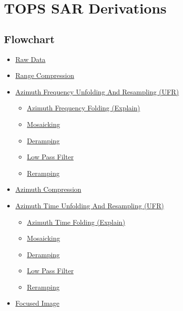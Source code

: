 \documentclass[10pt]{article}
\providecommand{\tightlist}{%
  \setlength{\itemsep}{0pt}\setlength{\parskip}{0pt}}
\begin{document}
\hypertarget{tops-sar-derivations}{%
\section{TOPS SAR Derivations}\label{tops-sar-derivations}}

\hypertarget{flowchart}{%
\subsection{Flowchart}\label{flowchart}}

\begin{itemize}
\tightlist
\item
  \protect\hyperlink{1-raw-data}{Raw Data}
\item
  \protect\hyperlink{2-range-compression}{Range Compression}
\item
  \protect\hyperlink{3-azimuth-frequency-unfolding-and-resampling-ufr}{Azimuth
  Frequency Unfolding And Resampling (UFR)}

  \begin{itemize}
  \tightlist
  \item
    \protect\hyperlink{31-azimuth-frequency-folding-explain}{Azimuth
    Frequency Folding (Explain)}
  \item
    \protect\hyperlink{32-mosaicking}{Mosaicking}
  \item
    \protect\hyperlink{33-deramping}{Deramping}
  \item
    \protect\hyperlink{34-low-pass-filter}{Low Pass Filter}
  \item
    \protect\hyperlink{35-reramping}{Reramping}
  \end{itemize}
\item
  \protect\hyperlink{4-azimuth-compression}{Azimuth Compression}
\item
  \protect\hyperlink{5-azimuth-time-unfolding-and-resampling-ufr}{Azimuth
  Time Unfolding And Resampling (UFR)}

  \begin{itemize}
  \tightlist
  \item
    \protect\hyperlink{51-azimuth-time-folding-explain}{Azimuth Time
    Folding (Explain)}
  \item
    \protect\hyperlink{52-mosaicking}{Mosaicking}
  \item
    \protect\hyperlink{53-deramping}{Deramping}
  \item
    \protect\hyperlink{54-low-pass-filter}{Low Pass Filter}
  \item
    \protect\hyperlink{55-reramping}{Reramping}
  \end{itemize}
\item
  \protect\hyperlink{6-focused-image}{Focused Image}
\end{itemize}
\end{document}
